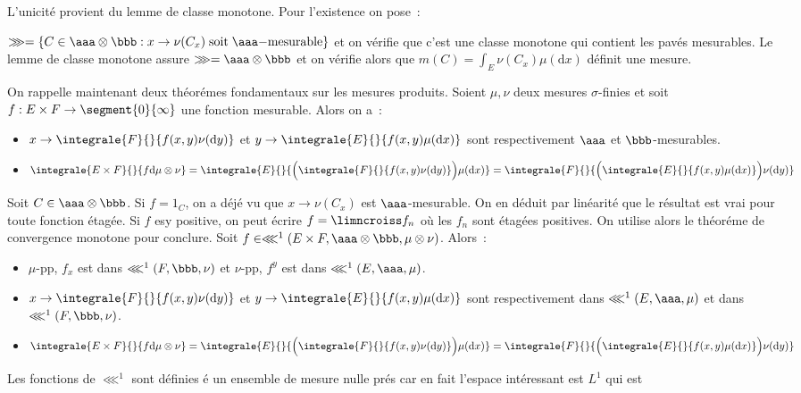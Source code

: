 \dem L'unicité provient du lemme de classe monotone. Pour l'existence on pose~:\par
$\ggg = \lbrace C\in \aaa\otimes\bbb : x\to\nu(C_x)\;\mathrm{soit}\;\aaa\mathrm{-mesurable}\rbrace$ et on vérifie que c'est une classe monotone qui contient les pavés mesurables. Le lemme
de classe monotone assure $\ggg = \aaa\otimes\bbb$ et on vérifie alors que $m(C) = \int_E \nu(C_x)\mu(\mathrm{d}x)$ définit une 
mesure.\par
On rappelle maintenant deux théorémes fondamentaux sur les mesures produits.
 Soient $\mu,\nu$ deux mesures $\sigma$-finies et soit $f : E\times F\to \segment{0}{\infty}$ une fonction 
mesurable. Alors on a~:
\begin{itemize}
\item{} $x\to \integrale{F}{}{f(x,y)\nu(\mathrm{d}y)}$ et $y\to \integrale{E}{}{f(x,y)\mu(\mathrm{d}x)}$ sont respectivement $\aaa$ et 
$\bbb$-mesurables. 
\item{} $\integrale{E\times F}{}{f\mathrm{d}\mu\otimes\nu} = \integrale{E}{}{\Bigl(\integrale{F}{}{f(x,y)\nu(\mathrm{d}y)}\Bigr)\mu(\mathrm{d}x)} = \integrale{F}{}{\Bigl(\integrale{E}{}{f(x,y)\mu(\mathrm{d}x)}\Bigr)\nu(\mathrm{d}y)}$
\end{itemize}\par
\dem Soit $C\in \aaa\otimes \bbb$. Si $f = 1_C$, on a déjé vu que $x\to \nu(C_x)$ est $\aaa$-mesurable. On en déduit par linéarité que
le résultat est vrai pour toute fonction étagée. Si $f$ esy positive, on peut écrire $f = \limncroiss f_n$ o\`u les $f_n$ sont étagées
positives. On utilise alors le théoréme de convergence monotone pour conclure.
 Soit $f\in \lll^1(E\times F, \aaa\otimes\bbb, \mu\otimes\nu)$. Alors~:\par
\begin{itemize}
\item{} $\mu$-pp, $f_x$ est dans $\lll^1(F,\bbb,\nu)$ et $\nu$-pp, $f^y$ est dans $\lll^1(E,\aaa,\mu)$.
\item{} $x\to \integrale{F}{}{f(x,y)\nu(\mathrm{d}y)}$ et $y\to \integrale{E}{}{f(x,y)\mu(\mathrm{d}x)}$ sont respectivement dans 
$\lll^1(E,\aaa,\mu)$ et dans $\lll^1(F,\bbb,\nu)$.
\item{} $\integrale{E\times F}{}{f\mathrm{d}\mu\otimes\nu} = \integrale{E}{}{\Bigl(\integrale{F}{}{f(x,y)\nu(\mathrm{d}y)}\Bigr)\mu(\mathrm{d}x)} = \integrale{F}{}{\Bigl(\integrale{E}{}{f(x,y)\mu(\mathrm{d}x)}\Bigr)\nu(\mathrm{d}y)}$
\end{itemize}
\rmq Les fonctions de $\lll^1$ sont définies é un ensemble de mesure nulle prés car en fait l'espace intéressant est $L^1$ qui est
